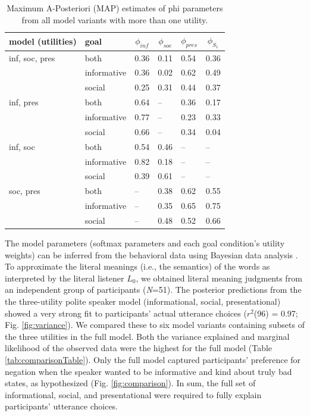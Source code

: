 \documentclass[9pt,twocolumn,twoside,lineno]{main_class_file}
\begin{document}
\begin{table}[tbp]
\begin{center}
\begin{threeparttable}
\caption{\label{tab:phi}Maximum A-Posteriori (MAP) estimates of phi parameters from all model variants with more than one utility.}
\begin{tabularx}{\columnwidth}{llllll}
\toprule
model (utilities) & \multicolumn{1}{l}{goal} & \multicolumn{1}{c}{$\phi_{inf}$} & \multicolumn{1}{c}{$\phi_{soc}$} & \multicolumn{1}{c}{$\phi_{pres}$} & \multicolumn{1}{c}{$\phi_{S_1}$}\\
\midrule
inf, soc, pres & both & 0.36 & 0.11 & 0.54 & 0.36\\
 & informative & 0.36 & 0.02 & 0.62 & 0.49\\
 & social & 0.25 & 0.31 & 0.44 & 0.37\\
inf, pres & both & 0.64 & -- & 0.36 & 0.17\\
 & informative & 0.77 & -- & 0.23 & 0.33\\
 & social & 0.66 & -- & 0.34 & 0.04\\
inf, soc & both & 0.54 & 0.46 & -- & --\\
 & informative & 0.82 & 0.18 & -- & --\\
 & social & 0.39 & 0.61 & -- & --\\
soc, pres & both & -- & 0.38 & 0.62 & 0.55\\
 & informative & -- & 0.35 & 0.65 & 0.75\\
 & social & -- & 0.48 & 0.52 & 0.66\\
\bottomrule
\end{tabularx}
\end{threeparttable}
\end{center}
\end{table}



The model parameters (softmax parameters and each goal condition's utility weights) can be inferred from the behavioral data using Bayesian data analysis \cite{lee2014}.
To approximate the literal meanings (i.e., the semantics) of the words as interpreted by the literal listener \(L_0\), we obtained literal meaning judgments from an independent group of participants
(\emph{N}=51).
The posterior predictions from the the three-utility polite speaker model (informational, social, presentational) showed a very strong fit to participants' actual utterance choices (\(r^2\)(96) = 0.97; Fig. \ref{fig:variance}).
We compared these to six model variants containing
subsets of the three utilities in the full model.
Both the variance explained and marginal likelihood of the observed data were the
highest for the full model (Table \ref{tab:comparisonTable}). Only the
full model captured participants' preference for negation when the speaker wanted to be informative and kind
about truly bad states, as hypothesized (Fig. \ref{fig:comparison}).
In sum, the full set of informational, social, and presentational were
required to fully explain participants' utterance choices.
\end{document}
